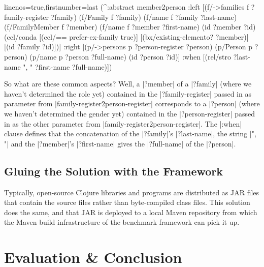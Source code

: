 \documentclass[a4paper]{article}
\newcommand{\code}{\clojureinline}
\begin{document}
\begin{clojurecode*}{linenos=true,firstnumber=last}
  (^:abstract member2person
   :left  [(f/->families f ?family-register ?family)
           (f/Family f ?family)
           (f/name f ?family ?last-name)
           (f/FamilyMember f ?member)
           (f/name f ?member ?first-name)
           (id ?member ?id)
           (ccl/conda
            [(ccl/== prefer-ex-family true)]
            [(bx/existing-elemento? ?member)]
            [(id ?family ?id)])]
   :right [(p/->persons p ?person-register ?person)
           (p/Person p ?person)
           (p/name p ?person ?full-name)
           (id ?person ?id)]
   :when  [(rel/stro ?last-name ", " ?first-name ?full-name)])
\end{clojurecode*}

So what are these common aspects?  Well, a \code|?member| of a \code|?family|
(where we haven't determined the role yet) contained in the
\code|?family-register| passed in as parameter from
\code|family-register2person-register| corresponds to a \code|?person| (where
we haven't determined the gender yet) contained in the \code|?person-register|
passed in as the other parameter from \code|family-register2person-register|.
The \code|:when| clause defines that the concatenation of the \code|?family|'s
\code|?last-name|, the string \code|", "| and the \code|?member|'s
\code|?first-name| gives the \code|?full-name| of the \code|?person|.


\subsection{Gluing the Solution with the Framework}
\label{sec:gluing}

Typically, open-source Clojure libraries and programs are distributed as JAR
files that contain the source files rather than byte-compiled class files.
This solution does the same, and that JAR is deployed to a local Maven
repository from which the Maven build infrastructure of the benchmark framework
can pick it up.



\section{Evaluation \& Conclusion}
\label{sec:evaluation}





\end{document}
